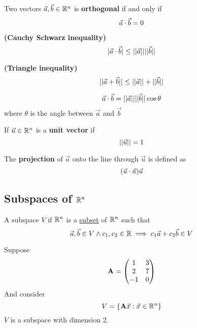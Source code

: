 \documentclass[]{article}
\begin{document}
        \begin{definition}
            Two vectors $\vec{a}, \vec{b} \in \mathbb{R}^n$ is \textbf{orthogonal} if and only if
            \[
                \vec{a} \cdot \vec{b} = 0
            \]
        \end{definition}
        
        \begin{theorem}
            \textbf{(Cauchy Schwarz inequality)}
            \[
                | \vec{a} \cdot \vec{b} | \leq \vert \vert \vec{{a}} \vert \vert \vert \vert \vec{{b}} \vert \vert
            \]
        \end{theorem}
        
        \begin{theorem}
        \textbf{(Triangle inequality)}
            \[
                \vert \vert {\vec{a} + \vec{b}} \vert \vert \leq \vert \vert \vec{{a}} \vert \vert + \vert \vert \vec{{b}} \vert \vert
            \]
        \end{theorem}
        
        \begin{theorem}
            \[
                \vec{a} \cdot \vec{b} = \vert \vert \vec{{a}} \vert \vert \vert \vert \vec{{b}} \vert \vert \cos{\theta}
            \]
            where $\theta$ is the angle between $\vec{a}$ and $\vec{b}$
        \end{theorem}
        
        \begin{definition}
            If $\vec{u} \in \mathbb{R}^n$ is a \textbf{unit vector} if  
            \[
                \vert \vert \vec{{u}} \vert \vert = 1
            \]
        \end{definition}
        
        \begin{definition}
            The \textbf{projection} of $\vec{a}$ onto the line through $\vec{u}$ is defined as 
            \[
                (\vec{u} \cdot \vec{a})\vec{u}
            \]
        \end{definition}
        
        \subsection{Subspaces of $\mathbb{R}^n$}
        \begin{definition}
            A subspace $V$ if $\mathbb{R}^n$ is a \ul{subset} of $\mathbb{R}^n$ such that
            \[
                \vec{a}, \vec{b} \in V \land
                c_1, c_2 \in \mathbb{R}
                \implies c_1 \vec{a} + c_2 \vec{b} \in V
            \]
        \end{definition}
        
        \begin{example}
            Suppose
            \[
                \textbf{A} = \begin{pmatrix}
                    1 & 3 \\
                    2 & 7 \\
                    -1 & 0 \\
                \end{pmatrix}
            \]
            And consider 
            \[
                V = \{\textbf{A} \vec{x}: \vec{x} \in \mathbb{R}^n\}
            \]
            $V$ is a subspace with dimension 2.
        \end{example}
        
\end{document}
